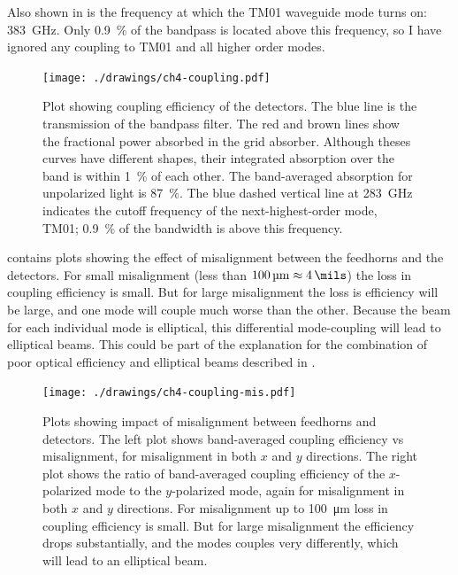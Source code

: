 Also shown in  is the frequency at which the TM01 waveguide mode turns on: \SI{383}{\GHz}.
Only \SI{0.9}{\percent} of the bandpass is located above this frequency, so I have ignored any coupling to TM01 and all higher order modes.

\begin{figure}
\centering
\texttt{[image: ./drawings/ch4-coupling.pdf]}
\caption[Detector coupling efficiency]{
  Plot showing coupling efficiency of the detectors.
  The blue line is the transmission of the bandpass filter.
  The red and brown lines show the fractional power absorbed in the grid absorber.
  Although theses curves have different shapes, their integrated absorption over the band is within \SI{1}{\percent} of each other.
  The band-averaged absorption for unpolarized light is \SI{87}{\percent}.
  The blue dashed vertical line at \SI{283}{\GHz} indicates the cutoff frequency of the next-highest-order mode, TM01; \SI{0.9}{\percent} of the bandwidth is above this frequency.
}
\label{fig:ch4-coupling}
\end{figure}

 contains plots showing the effect of misalignment between the feedhorns and the detectors.
For small misalignment (less than $\SI{100}{\um} \approx \SI{4}{\mils}$) the loss in coupling efficiency is small.
But for large misalignment the loss is efficiency will be large, and one mode will couple much worse than the other.
Because the beam for each individual mode is elliptical, this differential mode-coupling will lead to elliptical beams.
This could be part of the explanation for the combination of poor optical efficiency and elliptical beams described in .

\begin{figure}
\centering
\texttt{[image: ./drawings/ch4-coupling-mis.pdf]}
\caption[Feedhorn / detector misalignment]{
  Plots showing impact of misalignment between feedhorns and detectors.
  The left plot shows band-averaged coupling efficiency vs misalignment, for misalignment in both $x$ and $y$ directions.
  The right plot shows the ratio of band-averaged coupling efficiency of the $x$-polarized mode to the $y$-polarized mode, again for misalignment in both $x$ and $y$ directions.
  For misalignment up to \SI{100}{\um} loss in coupling efficiency is small.
  But for large misalignment the efficiency drops substantially, and the modes couples very differently, which will lead to an elliptical beam.
}
\label{fig:ch4-coupling-mis}
\end{figure}

